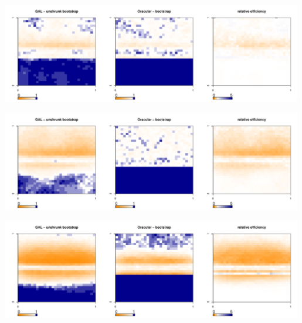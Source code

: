 \documentclass[authoryear, review, 11pt]{elsarticle}
\begin{document}
	\begin{center}
		\includegraphics[width=0.99\textwidth]{../../figures/X1-28-8.pdf}
		\label{fig:coveragemap8}
	\end{center}
	
	\begin{center}
		\includegraphics[width=0.99\textwidth]{../../figures/X1-28-9.pdf}
		\label{fig:coveragemap9}
	\end{center}
	
	\begin{center}
		\includegraphics[width=0.99\textwidth]{../../figures/X1-28-10.pdf}
		\label{fig:coveragemap10}
	\end{center}
        
\end{document}
